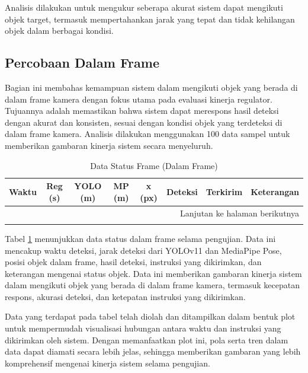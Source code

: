 Analisis dilakukan untuk mengukur seberapa akurat sistem dapat mengikuti objek target, termasuk mempertahankan jarak yang tepat dan tidak kehilangan objek dalam berbagai kondisi.

\subsection{Percobaan Dalam Frame}
\label{subsec:percobaandalamframe}

Bagian ini membahas kemampuan sistem dalam mengikuti objek yang berada di dalam frame kamera dengan fokus utama pada evaluasi kinerja regulator. Tujuannya adalah memastikan bahwa sistem dapat merespons hasil deteksi dengan akurat dan konsisten, sesuai dengan kondisi objek yang terdeteksi di dalam frame kamera. Analisis dilakukan menggunakan 100 data sampel untuk memberikan gambaran kinerja sistem secara menyeluruh.

\begin{longtable}{|c|c|c|c|c|c|c|c|}
    \caption{Data Status Frame (Dalam Frame)} \label{tab:status_dalam_frame} \\
    \hline
    Waktu & Reg (s) & YOLO (m) & MP (m) & x (px) & Deteksi & Terkirim & Keterangan \\ \hline
    \endhead
    \hline \multicolumn{8}{|r|}{Lanjutan ke halaman berikutnya} \\ \hline
    \endfoot
    \endlastfoot
    
\end{longtable}

Tabel \ref{tab:status_dalam_frame} menunjukkan data status dalam frame selama pengujian. Data ini mencakup waktu deteksi, jarak deteksi dari YOLOv11 dan MediaPipe Pose, posisi objek dalam frame, hasil deteksi, instruksi yang dikirimkan, dan keterangan mengenai status objek. Data ini memberikan gambaran kinerja sistem dalam mengikuti objek yang berada di dalam frame kamera, termasuk kecepatan respons, akurasi deteksi, dan ketepatan instruksi yang dikirimkan.

Data yang terdapat pada tabel telah diolah dan ditampilkan dalam bentuk plot untuk mempermudah visualisasi hubungan antara waktu dan instruksi yang dikirimkan oleh sistem. Dengan memanfaatkan plot ini, pola serta tren dalam data dapat diamati secara lebih jelas, sehingga memberikan gambaran yang lebih komprehensif mengenai kinerja sistem selama pengujian.

